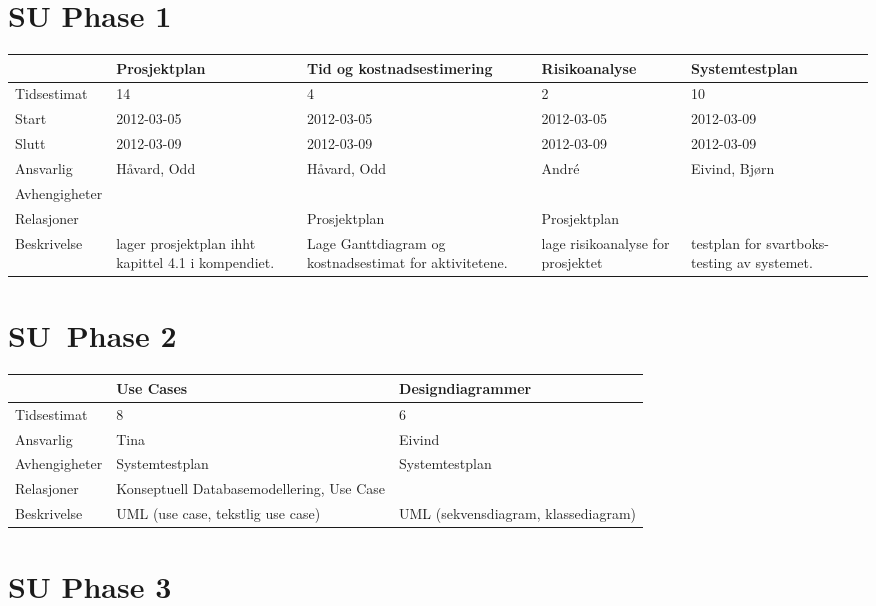 \documentclass{article}
\begin{document}
\section{SU Phase 1}

\begin{tabular}{|l|p{3cm}|p{3cm}|p{3cm}|p{3cm}|}
\hline
& Prosjektplan & Tid og kostnadsestimering & Risikoanalyse & Systemtestplan
\\ \hline
Tidsestimat & 14 & 4 & 2 & 10 \\ \hline
Start & 2012-03-05 & 2012-03-05 & 2012-03-05 & 2012-03-09 \\ \hline
Slutt & 2012-03-09 & 2012-03-09 & 2012-03-09 & 2012-03-09 \\ \hline
Ansvarlig & H\aa vard, Odd & H\aa vard, Odd & Andr\'{e} & Eivind, Bj\o rn \\ 
\hline
Avhengigheter &  &  &  &  \\ \hline
Relasjoner &  & Prosjektplan & Prosjektplan &  \\ \hline
Beskrivelse & lager prosjektplan ihht kapittel 4.1 i kompendiet. & Lage
Ganttdiagram og kostnadsestimat for aktivitetene. & lage risikoanalyse for
prosjektet & testplan for svartboks-testing av systemet. \\ \hline
\end{tabular}

\section{SU\ Phase 2}

\begin{tabular}{|l|p{3cm}|p{3cm}|}
\hline
& Use Cases & Designdiagrammer \\ \hline
Tidsestimat & 8 & 6 \\ \hline
Ansvarlig & Tina & Eivind \\ \hline
Avhengigheter & Systemtestplan & Systemtestplan \\ \hline
Relasjoner & Konseptuell Databasemodellering, Use Case &  \\ \hline
Beskrivelse & UML (use case, tekstlig use case) & UML (sekvensdiagram,
klassediagram) \\ \hline
\end{tabular}

\section{SU Phase 3}
\end{document}
